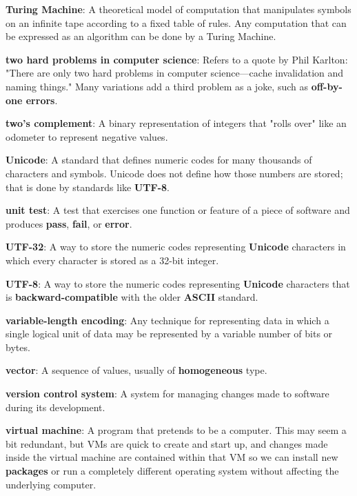 \documentclass{scrbook}
\newcommand{\glosskey}[1]{\textbf{#1}}
\begin{document}
\noindent \textbf{\glosskey{Turing Machine}}: 
A theoretical model of computation that manipulates symbols on an infinite tape according to a fixed table of rules. Any computation that can be expressed as an algorithm can be done by a Turing Machine.


\noindent \textbf{\glosskey{two hard problems in computer science}}: 
Refers to a quote by Phil Karlton: "There are only two hard problems in computer science—cache invalidation and naming things." Many variations add a third problem as a joke, such as \glosskey{off-by-one errors}.


\noindent \textbf{\glosskey{two's complement}}: 
A binary representation of integers that "rolls over" like an odometer to represent negative values.


\noindent \textbf{\glosskey{Unicode}}: 
A standard that defines numeric codes for many thousands of characters and symbols. Unicode does not define how those numbers are stored; that is done by standards like \glosskey{UTF-8}.


\noindent \textbf{\glosskey{unit test}}: 
A test that exercises one function or feature of a piece of software and produces \glosskey{pass}, \glosskey{fail}, or \glosskey{error}.


\noindent \textbf{\glosskey{UTF-32}}: 
A way to store the numeric codes representing \glosskey{Unicode} characters in which every character is stored as a 32-bit integer.


\noindent \textbf{\glosskey{UTF-8}}: 
A way to store the numeric codes representing \glosskey{Unicode} characters that is \glosskey{backward-compatible} with the older \glosskey{ASCII} standard.


\noindent \textbf{\glosskey{variable-length encoding}}: 
Any technique for representing data in which a single logical unit of data may be represented by a variable number of bits or bytes.


\noindent \textbf{\glosskey{vector}}: 
A sequence of values, usually of \glosskey{homogeneous} type.


\noindent \textbf{\glosskey{version control system}}: 
A system for managing changes made to software during its development.


\noindent \textbf{\glosskey{virtual machine}}: 
A program that pretends to be a computer. This may seem a bit redundant, but VMs are quick to create and start up, and changes made inside the virtual machine are contained within that VM so we can install new \glosskey{packages} or run a completely different operating system without affecting the underlying computer.
\end{document}
